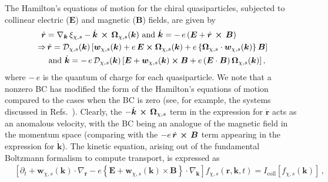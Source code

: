 \documentclass[aps,prb,onecolumn,nofootinbib,citeautoscript,10pt]{revtex4-2}
\def \nn{\nonumber \\}
\begin{document}
The Hamilton's equations of motion for the chiral quasiparticles, subjected to collinear electric ($\boldsymbol{E}$) and magnetic ($\boldsymbol{B}$) fields, are given by \cite{mermin, sundaram99_wavepacket, li2023_planar, ips-kush-review, ips-rsw-ph, ips-shreya}
\begin{align}
\label{eqrkdot}
\dot {\boldsymbol r} & = \nabla_{\boldsymbol k} \, \xi_{\chi, s}  
- \dot{\boldsymbol k} \, \cross \, \boldsymbol \Omega_{\chi, s}  (\boldsymbol k)
 \text{ and }  
\dot{\boldsymbol k} = -\, e  \left( {\boldsymbol E}  
+ \dot{\boldsymbol r} \, \cross\, {\boldsymbol B} 
	\right ) \nn
\Rightarrow & \, \dot{\boldsymbol r}  = \mathcal{D}_{\chi, s} ({\boldsymbol k})
	\left[   \boldsymbol{w}_{\chi, s} ({\boldsymbol k}) +
	 e \, {\boldsymbol E}  \cross  
\boldsymbol \Omega_{\chi, s} ({\boldsymbol k})   + 
	 e   \left \lbrace \boldsymbol \Omega_{\chi, s} \cdot 
 \boldsymbol{w}_{\chi, s} ({\boldsymbol k}) 
 \right \rbrace  \boldsymbol B  \right] 
\nn & \text{ and } 
\dot{\boldsymbol k}  = -\, e \,\mathcal{D}_{\chi, s} ({\boldsymbol k})
  \left[   {\boldsymbol E} 
+   \boldsymbol{w}_{\chi, s} ({\boldsymbol k}) \cross  {\boldsymbol B} 
+  e  \left (  {\boldsymbol E}\cdot  {\boldsymbol B} \right )  
\boldsymbol \Omega_{\chi, s}  ({\boldsymbol k})\right],
\end{align}
where $-\, e$ is the quantum of charge for each quasiparticle. We note that a nonzero BC has modified the form of the Hamilton's equations of motion compared to the cases when the BC is zero (see, for example, the systems discussed in Refs.~\cite{ips-kush, ips_tilted_dirac}). Clearly, the $- \dot{\boldsymbol k} \, \cross \, \boldsymbol \Omega_{\chi, s} $ term in the expression for $\dot {\boldsymbol r}$ acts as an anomalous velocity, with the BC being an analogue of the magnetic field in the momentum space (comparing with the $ - e \, \dot{\boldsymbol r} \, \cross\, {\boldsymbol B} $ term appearing in
the expression for $\dot {\boldsymbol k}$). The kinetic equation, arising out of the fundamental Boltzmann formalism to compute transport, is expressed as
\begin{align}
\label{eqkin32}
& \left [ \partial_t  
+ {\boldsymbol w}_{\chi, s} ({\boldsymbol k}) \cdot \nabla_{\boldsymbol r} 
-e \left \lbrace  \boldsymbol{E}
+  {\boldsymbol w}_{\chi, s} ({\boldsymbol k})  \times {\boldsymbol B} 
\right \rbrace  \cdot 
\nabla_{\boldsymbol k} \right ] f_{\chi, s} (\boldsymbol r, \boldsymbol k, t)
=  I_{\text{coll}} [f_{\chi, s} ({\boldsymbol k}) ]\,,
\end{align}
\end{document}
